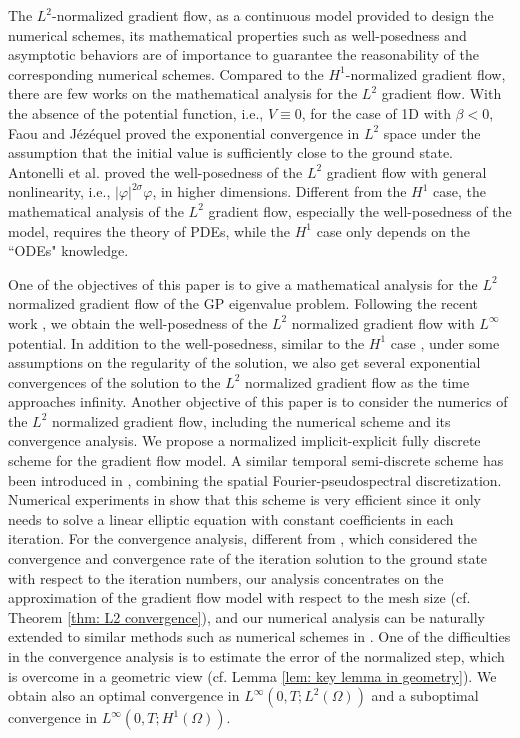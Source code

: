 \documentclass{siamart250211}
\begin{document}
The $L^2$-normalized gradient flow, as a continuous model provided to design the numerical schemes, its mathematical properties such as well-posedness and asymptotic behaviors are of importance to guarantee the reasonability of the corresponding numerical schemes. Compared to the $H^1$-normalized gradient flow, there are few works on the mathematical analysis for the $L^2$ gradient flow. With the absence of the potential function, i.e., $V \equiv 0$, for the case of 1D with $\beta<0$, Faou and J\'{e}z\'{e}quel \cite{faou2018convergence} proved the exponential convergence in $L^2$ space under the assumption that the initial value is sufficiently close to the ground state. Antonelli et al. \cite{antonelli2024existence} proved the well-posedness of the $L^2$ gradient flow with general nonlinearity, i.e., $|\varphi|^{2\sigma}\varphi$, in higher dimensions. Different from the $H^1$ case, the mathematical analysis of the $L^2$ gradient flow, especially the well-posedness of the model, requires the theory of PDEs, while the $H^1$ case only depends on the ``ODEs" knowledge.

One of the objectives of this paper is to give a mathematical analysis for the $L^2$ normalized gradient flow of the GP eigenvalue problem. Following the recent work \cite{antonelli2024existence}, we obtain the well-posedness of the $L^2$ normalized gradient flow with $L^{\infty}$ potential. In addition to the well-posedness, similar to the $H^1$ case \cite{henning2020sobolev, kazemi2010minimizing}, under some assumptions on the regularity of the solution, we also get several exponential convergences of the solution to the $L^2$ normalized gradient flow as the time approaches infinity. Another objective of this paper is to consider the numerics of the $L^2$ normalized gradient flow, including the numerical scheme and its convergence analysis. We propose a normalized implicit-explicit fully discrete scheme for the gradient flow model. A similar temporal semi-discrete scheme has been introduced in \cite{liu2021normalized}, combining the spatial Fourier-pseudospectral discretization. Numerical experiments in \cite{liu2021normalized} show that this scheme is very efficient since it only needs to solve a linear elliptic equation with constant coefficients in each iteration. For the convergence analysis, different from \cite{faou2018convergence, henning2023dependency}, which considered the convergence and convergence rate of the iteration solution to the ground state with respect to the iteration numbers, our analysis concentrates on the approximation of the gradient flow model with respect to the mesh size (cf. Theorem \ref{thm: L2 convergence}), and our numerical analysis can be naturally extended to similar methods such as numerical schemes in \cite{liu2021normalized}. One of the difficulties in the convergence analysis is to estimate the error of the normalized step, which is overcome in a geometric view (cf. Lemma \ref{lem: key lemma in geometry}). We obtain also an optimal convergence in $L^{\infty}(0,T;L^2(\Omega))$ and a suboptimal convergence in $L^{\infty}(0,T;H^1(\Omega))$.
\end{document}
